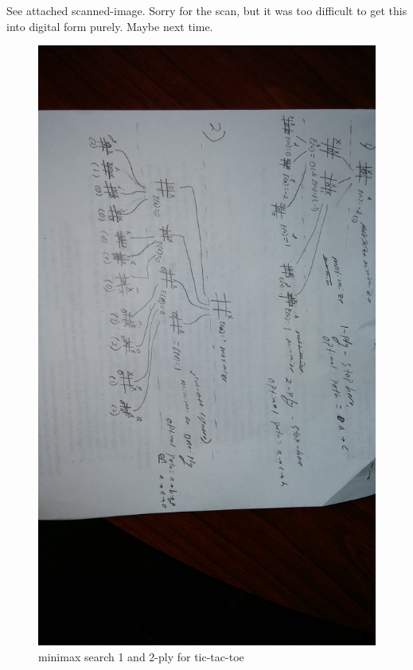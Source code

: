 \documentclass[11pt]{article}
\begin{document}
\begin{enumerate}
See attached scanned-image. Sorry for the scan, but it was too difficult to get this into digital form purely. Maybe next time. 
\begin{figure}[ht!]
\centering
\includegraphics[width=200mm]{HW3MINIMAXAI.jpg}
\caption{minimax search 1 and 2-ply for tic-tac-toe \label{overflow}}
\end{figure}
\end{enumerate}
\end{document}
